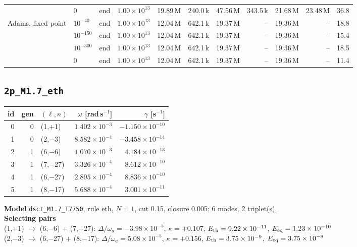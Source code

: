 {\begin{tabular}{@{}llllrrrrrrr@{}}
 & $0$ & end & $1.00\times10^{13}$ & 19.89\,M & 240.0\,k & 47.56\,M & 343.5\,k & 21.68\,M & 23.48\,M & 36.8 \\
\addlinespace[2pt]
Adams, fixed point & $10^{-40}$ & end & $1.00\times10^{13}$ & 12.04\,M & 642.1\,k & 19.37\,M & -- & 19.36\,M & -- & 18.8 \\
 & $10^{-150}$ & end & $1.00\times10^{13}$ & 12.04\,M & 642.1\,k & 19.37\,M & -- & 19.36\,M & -- & 15.4 \\
 & $10^{-300}$ & end & $1.00\times10^{13}$ & 12.04\,M & 642.1\,k & 19.37\,M & -- & 19.36\,M & -- & 18.5 \\
 & $0$ & end & $1.00\times10^{13}$ & 12.04\,M & 642.1\,k & 19.37\,M & -- & 19.36\,M & -- & 11.4 \\
\bottomrule
\end{tabular}}

\clearpage
\subsection{\texttt{2p\_M1.7\_eth}}\label{net:2p_M1.7_eth}
\noindent\begin{minipage}[t]{0.43\textwidth}\vspace{0pt}\footnotesize
\begin{tabular}{@{}rrlrr@{}}
\toprule
id & gen & $(\ell,n)$ & $\omega$ [rad\,s$^{-1}$] & $\gamma$ [s$^{-1}$] \\
\midrule
0 & 0 & (1,+1) & $1.402\times10^{-3}$ & $-1.150\times10^{-10}$ \\
1 & 0 & (2,$-$3) & $8.582\times10^{-4}$ & $-3.458\times10^{-14}$ \\
2 & 1 & (6,$-$6) & $1.070\times10^{-3}$ & $4.184\times10^{-13}$ \\
3 & 1 & (7,$-$27) & $3.326\times10^{-4}$ & $8.612\times10^{-10}$ \\
4 & 1 & (6,$-$27) & $2.895\times10^{-4}$ & $8.836\times10^{-10}$ \\
5 & 1 & (8,$-$17) & $5.688\times10^{-4}$ & $3.001\times10^{-11}$ \\
\bottomrule
\end{tabular}
\end{minipage}\hfill
\begin{minipage}[t]{0.55\textwidth}\vspace{0pt}\footnotesize
\textbf{Model} \texttt{dsct\_M1.7\_T7750}, rule eth, $N=1$, cut 0.15,
closure 0.005; 6 modes, 2 triplet(s).\\[2pt]
\textbf{Selecting pairs}\\ (1,+1) $\to$ (6,$-$6) + (7,$-$27): $\Delta/\omega_a=-3.98\times10^{-5}$, $\kappa=+0.107$, $E_{\rm th}=9.22\times10^{-11}$, $E_{\rm eq}=1.23\times10^{-10}$\\
(2,$-$3) $\to$ (6,$-$27) + (8,$-$17): $\Delta/\omega_a=5.08\times10^{-5}$, $\kappa=+0.156$, $E_{\rm th}=3.75\times10^{-9}$, $E_{\rm eq}=3.75\times10^{-9}$\\[2pt]

\end{minipage}

